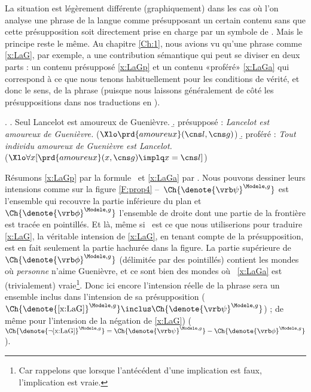 La situation est légèrement différente (graphiquement) dans les cas où l'on analyse une phrase de la langue comme présupposant un certain contenu sans que cette présupposition soit directement prise en charge par un symbole de {\LO}.  
Mais le principe reste le même.  Au chapitre \ref{Ch:1}, nous avions vu qu'une phrase comme \ref{x:LaG}, par exemple, a une contribution sémantique qui peut se diviser en deux parts : un contenu présupposé \ref{x:LaGp} et un contenu «proféré» \ref{x:LaGa} qui correspond à ce que nous tenons habituellement pour les conditions de vérité, et donc le sens, de la phrase (puisque nous laissons généralement de côté les présuppositions dans nos traductions en {\LO}). 

\ex. 
\a. Seul Lancelot est amoureux de  Guenièvre.\label{x:LaG}
\b. présupposé : \emph{Lancelot est amoureux de  Guenièvre.}\label{x:LaGp}
(\(\Xlo \prd{amoureux}(\cns l,\cns g)\))
\b. proféré : %
\emph{Tout individu amoureux de Guenièvre est Lancelot.}\label{x:LaGa}\\
(\(\Xlo\forall x [\prd{amoureux}(x,\cns g)\implq x=\cns l]\))


Résumons \ref{x:LaGp}  par la formule \vrb\psi\ et \ref{x:LaGa} par \vrb\phi.  Nous pouvons dessiner leurs intensions comme sur la figure \ref{F:prop4} --~\(\Ch{\denote{\vrb\psi}^{\Modele,g}}\) est l'ensemble qui recouvre la partie inférieure du plan et \(\Ch{\denote{\vrb\phi}^{\Modele,g}}\) l'ensemble de droite dont une partie de la frontière est tracée en pointillés.
Et là, même si \vrb\phi\ est ce que nous utiliserions pour traduire \ref{x:LaG}, la véritable intension de \ref{x:LaG}, en tenant compte de la présupposition, est en fait seulement la partie hachurée dans la figure. La partie supérieure de \(\Ch{\denote{\vrb\phi}^{\Modele,g}}\) (délimitée par des pointillés) contient les mondes où \emph{personne} n'aime Guenièvre, et ce sont bien des mondes où \vrb\phi\ \ref{x:LaGa} est (trivialement) vraie\footnote{Car rappelons que lorsque l'antécédent d'une implication est faux, l'implication est vraie. }. Donc ici encore l'intension réelle de la phrase sera un ensemble inclus dans l'intension de sa présupposition (\(\Ch{\denote{\text{\ref{x:LaG}}}^{\Modele,g}} \inclus
\Ch{\denote{\vrb\psi}^{\Modele,g}}\)) ; de même pour l'intension de la négation de \ref{x:LaG}) 
(\(\Ch{\denote{\neg\text{\ref{x:LaG}}}^{\Modele,g}} = 
\Ch{\denote{\vrb\psi}^{\Modele,g}} - \Ch{\denote{\vrb\phi}^{\Modele,g}}\)).


